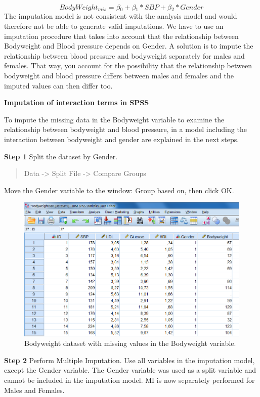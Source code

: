 \documentclass[
]{book}
\begin{document}
\[BodyWeight{_{mis}} = β{_0} + β{_1} * SBP + β{_2} * Gender\]
The imputation model is not consistent with the analysis model and would therefore not be able to generate valid imputations. We have to use an imputation procedure that takes into account that the relationship between Bodyweight and Blood pressure depends on Gender. A solution is to impute the relationship between blood pressure and bodyweight separately for males and females. That way, you account for the possibility that the relationship between bodyweight and blood pressure differs between males and females and the imputed values can then differ too.

\textbf{Imputation of interaction terms in SPSS}

To impute the missing data in the Bodyweight variable to examine the relationship between bodyweight and blood pressure, in a model including the interaction between bodyweight and gender are explained in the next steps.

\textbf{Step 1}
Split the dataset by Gender.

\begin{quote}
Data -\textgreater{} Split File -\textgreater{} Compare Groups
\end{quote}

Move the Gender variable to the window: Group based on, then click OK.

\begin{figure}

{\centering \includegraphics[width=0.9\linewidth]{images/fig6.2} 

}

\caption{Bodyweight dataset with missing values in the Bodyweight variable.}\label{fig:fig6-2}
\end{figure}

\textbf{Step 2}
Perform Multiple Imputation. Use all variables in the imputation model, except the Gender variable. The Gender variable was used as a split variable and cannot be included in the imputation model. MI is now separately performed for Males and Females.
\end{document}
